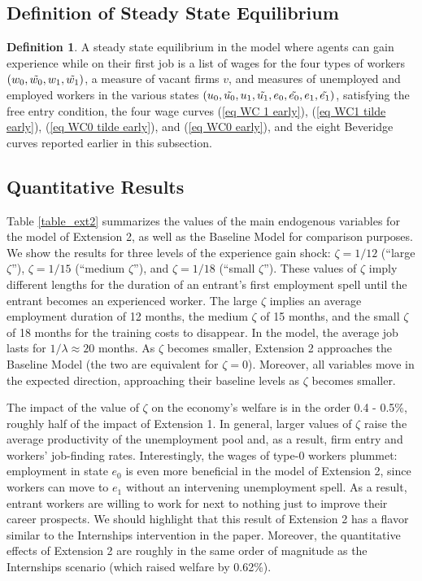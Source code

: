 \documentclass[12pt]{article} %
\theoremstyle{definition}
\newtheorem{definition}{Definition}%
\begin{document}
\medskip


\subsection*{Definition of Steady State Equilibrium}\label{section definition of equil} 


\begin{definition}\label{definition equilibrium gain early}
A steady state equilibrium in the model where agents can gain experience while on their first job is a list of wages for the four types of workers $(w_0, \Tilde{w_0}, w_1, \Tilde{w_1})$, a measure of vacant firms $v$, and measures of unemployed and employed workers in the various states $(u_0, \Tilde{u_0}, u_1, \Tilde{u_1}, e_0, \Tilde{e_0}, e_1, \Tilde{e_1})$, satisfying the free entry condition, 
the four wage curves (\ref{eq WC 1 early}), (\ref{eq WC1 tilde early}), (\ref{eq WC0 tilde early}), and (\ref{eq WC0 early}), and the eight Beveridge curves reported earlier in this subsection. 
\end{definition} 


\subsection*{Quantitative Results} 

Table \ref{table_ext2} summarizes the values of the main endogenous variables for the model of Extension 2, as well as the Baseline Model for comparison purposes.
We show the results for three levels of the experience gain shock: $\zeta = 1/12$ (``large $\zeta$''),  $\zeta = 1/15$ (``medium $\zeta$''), and $\zeta = 1/18$ (``small $\zeta$'').
These values of $\zeta$ imply different lengths for the duration of an entrant's first employment spell until the entrant becomes an experienced worker.
The large $\zeta$ implies an average employment duration of 12 months, the medium $\zeta$ of 15 months, and the small $\zeta$ of 18 months for the training costs to disappear.
In the model, the average job lasts for $1/\lambda \approx 20$ months.
As $\zeta$ becomes smaller, Extension 2 approaches the Baseline Model (the two are equivalent for $\zeta = 0$).
Moreover, all variables move in the expected direction, approaching their baseline levels as $\zeta$ becomes smaller.

The impact of the value of $\zeta$ on the economy's welfare is in the order 0.4 - 0.5\%, roughly half of the impact of Extension 1.
In general, larger values of $\zeta$ raise the average productivity of the unemployment pool and, as a result, firm entry and workers' job-finding rates.
Interestingly, the wages of type-0 workers plummet: employment in state $e_{0}$ is even more beneficial in the model of Extension 2, since workers can move to $e_{1}$ without an intervening unemployment spell.
As a result, entrant workers are willing to work for next to nothing just to improve their career prospects.
We should highlight that this result of Extension 2 has a flavor similar to the Internships intervention in the paper.
Moreover, the quantitative effects of Extension 2 are roughly in the same order of magnitude as the Internships scenario (which raised welfare by 0.62\%).
\end{document}
